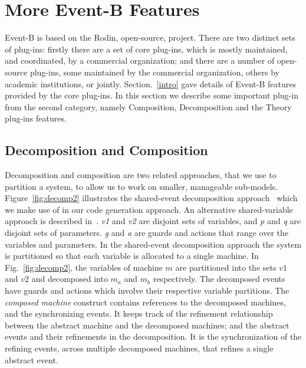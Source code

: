 \section{More Event-B Features}\label{features}
Event-B is based on the Rodin, open-source, project. There are two distinct sets of plug-ins: firstly there are a set of core plug-ins, which is mostly maintained, and coordinated, by a commercial organization; and there are a number of open-source plug-ins, some maintained by the commercial organization, others by academic institutions, or jointly. Section.~\ref{intro} gave details of Event-B features provided by the core plug-ins. In this section we describe some important plug-in from the second category, namely Composition, Decomposition and the Theory plug-ins features. 
\subsection{Decomposition and Composition}

Decomposition and composition are two related approaches, that we use to partition a system, to allow us to work on smaller, manageable sub-models. Figure~\ref{fig:decomp2} illustrates the shared-event decomposition approach~\cite{decomp2010c} which we make use of in our code generation approach. An alternative shared-variable approach is described in~\cite{AbrialH07}. \emph{v1} and \emph{v2} are disjoint sets of variables, and \emph{p} and \emph{q} are disjoint sets of parameters. \emph{g} and \emph{a} are guards and actions that range over the  variables and parameters. In the shared-event decomposition approach the system is partitioned so that each variable is allocated to a single machine. In Fig.~\ref{fig:decomp2}, the variables of machine $m$ are partitioned into the sets $v1$ and $v2$ and decomposed into $m_a$ and $m_b$ respectively. The decomposed events have guards and actions which involve their respective variable partitions. The \emph{composed machine} construct contains references to the decomposed machines, and the synchronizing events. It keeps track of the refinement relationship between the abstract machine and the decomposed machines; and the abstract events and their refinements in the decomposition. It is the synchronization of the refining events, across multiple decomposed machines, that refines a single abstract event. 


